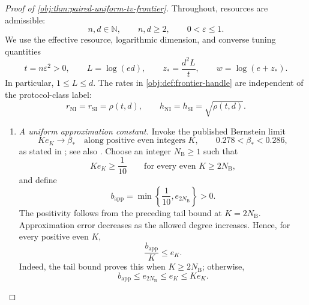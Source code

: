 \begin{proof}[Proof of \cref{obj:thm:paired-uniform-tv-frontier}]
Throughout, resources are admissible:
\[
n,d\in\mathbb N,\qquad n,d\ge2,\qquad 0<\varepsilon\le1.
\]
We use the effective resource, logarithmic dimension, and converse tuning quantities
\[
t=n\varepsilon^2>0,\qquad L=\log(ed),\qquad
z_*=\frac{d^2L}{t},\qquad w=\log(e+z_*).
\]
In particular, \(1\le L\le d\). The rates in \cref{obj:def:frontier-handle} are independent of the protocol-class label:
\[
r_{\mathrm{NI}}=r_{\mathrm{SI}}=\rho(t,d),
\qquad
h_{\mathrm{NI}}=h_{\mathrm{SI}}=\sqrt{\rho(t,d)}.
\]

\begin{enumerate}
\item \textit{A uniform approximation constant.}
Invoke the published Bernstein limit
\[
K e_K\longrightarrow\beta_*
\quad\text{along positive even integers }K,
\qquad 0.278<\beta_*<0.286,
\]
as stated in \citep[Section 3.1, definition of the Bernstein constant and the immediately following paragraph, p.~8]{CaiLow2011Nonsmooth}; see also \citep{Bernstein1913}.
Choose an integer \(N_{\mathrm B}\ge1\) such that
\[
K e_K\ge\frac1{10}
\qquad\text{for every even }K\ge2N_{\mathrm B},
\]
and define
\[
b_{\mathrm{app}}
=\min\left\{\frac1{10},e_{2N_{\mathrm B}}\right\}>0.
\]
The positivity follows from the preceding tail bound at \(K=2N_{\mathrm B}\).
Approximation error decreases as the allowed degree increases. Hence, for every positive even \(K\),
\[
\frac{b_{\mathrm{app}}}{K}\le e_K.
\]
Indeed, the tail bound proves this when \(K\ge2N_{\mathrm B}\); otherwise,
\[
b_{\mathrm{app}}\le e_{2N_{\mathrm B}}\le e_K\le K e_K.
\]


\end{enumerate}
\end{proof}
